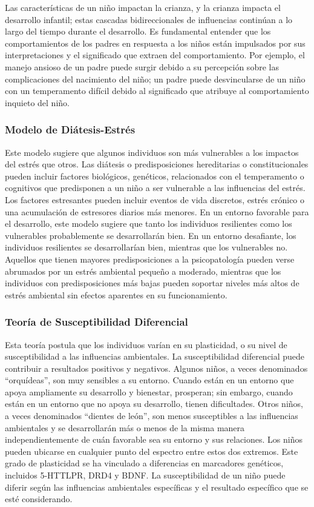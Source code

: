 \documentclass[11pt,letterpaper]{report}
\begin{document}
Las características de un niño impactan la crianza, y la crianza impacta el
desarrollo infantil; estas cascadas bidireccionales de influencias continúan a
lo largo del tiempo durante el desarrollo. Es fundamental entender que los
comportamientos de los padres en respuesta a los niños están impulsados por
sus interpretaciones y el significado que extraen del comportamiento. Por
ejemplo, el manejo ansioso de un padre puede surgir debido a su percepción
sobre las complicaciones del nacimiento del niño; un padre puede desvincularse
de un niño con un temperamento difícil debido al significado que atribuye al
comportamiento inquieto del niño. \cite{Sameroff2009}

\subsubsection{Modelo de Diátesis-Estrés}
Este modelo sugiere que algunos individuos son más vulnerables a los impactos
del estrés que otros. Las diátesis o predisposiciones hereditarias o
constitucionales pueden incluir factores biológicos, genéticos, relacionados
con el temperamento o cognitivos que predisponen a un niño a ser vulnerable a
las influencias del estrés. Los factores estresantes pueden incluir eventos de
vida discretos, estrés crónico o una acumulación de estresores diarios más
menores. En un entorno favorable para el desarrollo, este modelo sugiere que
tanto los individuos resilientes como los vulnerables probablemente se
desarrollarán bien. En un entorno desafiante, los individuos resilientes se
desarrollarían bien, mientras que los vulnerables no. Aquellos que tienen
mayores predisposiciones a la psicopatología pueden verse abrumados por un
estrés ambiental pequeño a moderado, mientras que los individuos con 
predisposiciones más bajas pueden soportar niveles más altos de estrés
ambiental sin efectos aparentes en su funcionamiento. \cite{Feldman3}

\subsubsection{Teoría de Susceptibilidad Diferencial}
Esta teoría postula que los individuos varían en su plasticidad, o su nivel de
susceptibilidad a las influencias ambientales. \cite{Belsky2021} La
susceptibilidad diferencial puede contribuir a resultados positivos y
negativos. Algunos niños, a veces denominados ``orquídeas'', son muy sensibles
a su entorno. Cuando están en un entorno que apoya ampliamente su desarrollo y
bienestar, prosperan; sin embargo, cuando están en un entorno que no apoya su
desarrollo, tienen dificultades. Otros niños, a veces denominados ``dientes de
león'', son menos susceptibles a las influencias ambientales y se
desarrollarán más o menos de la misma manera independientemente de cuán
favorable sea su entorno y sus relaciones. Los niños pueden ubicarse en
cualquier punto del espectro entre estos dos extremos. Este grado de
plasticidad se ha vinculado a diferencias en marcadores genéticos, incluidos
5-HTTLPR, DRD4 y BDNF. \cite{Belsky2021} La susceptibilidad de un niño puede
diferir según las influencias ambientales específicas y el resultado específico
que se esté considerando. \cite{Feldman3}
\end{document}
